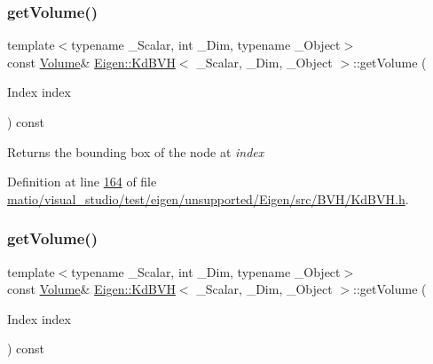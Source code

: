 \subsubsection{\texorpdfstring{get\+Volume()}{getVolume()}\hspace{0.1cm}{\footnotesize\ttfamily [1/2]}}
{\footnotesize\ttfamily template$<$typename \+\_\+\+Scalar, int \+\_\+\+Dim, typename \+\_\+\+Object$>$ \\
const \hyperlink{group___geometry___module_class_eigen_1_1_aligned_box}{Volume}\& \hyperlink{class_eigen_1_1_kd_b_v_h}{Eigen\+::\+Kd\+B\+VH}$<$ \+\_\+\+Scalar, \+\_\+\+Dim, \+\_\+\+Object $>$\+::get\+Volume (\begin{DoxyParamCaption}\item[{Index}]{index }\end{DoxyParamCaption}) const\hspace{0.3cm}{\ttfamily [inline]}}

\begin{DoxyReturn}{Returns}
the bounding box of the node at {\itshape index} 
\end{DoxyReturn}


Definition at line \hyperlink{matio_2visual__studio_2test_2eigen_2unsupported_2_eigen_2src_2_b_v_h_2_kd_b_v_h_8h_source_l00164}{164} of file \hyperlink{matio_2visual__studio_2test_2eigen_2unsupported_2_eigen_2src_2_b_v_h_2_kd_b_v_h_8h_source}{matio/visual\+\_\+studio/test/eigen/unsupported/\+Eigen/src/\+B\+V\+H/\+Kd\+B\+V\+H.\+h}.

\mbox{\label{class_eigen_1_1_kd_b_v_h_a59e7a2afb19fe7ae919fb95425bd6bf0}} 
\subsubsection{\texorpdfstring{get\+Volume()}{getVolume()}\hspace{0.1cm}{\footnotesize\ttfamily [2/2]}}
{\footnotesize\ttfamily template$<$typename \+\_\+\+Scalar, int \+\_\+\+Dim, typename \+\_\+\+Object$>$ \\
const \hyperlink{group___geometry___module_class_eigen_1_1_aligned_box}{Volume}\& \hyperlink{class_eigen_1_1_kd_b_v_h}{Eigen\+::\+Kd\+B\+VH}$<$ \+\_\+\+Scalar, \+\_\+\+Dim, \+\_\+\+Object $>$\+::get\+Volume (\begin{DoxyParamCaption}\item[{Index}]{index }\end{DoxyParamCaption}) const\hspace{0.3cm}{\ttfamily [inline]}}

